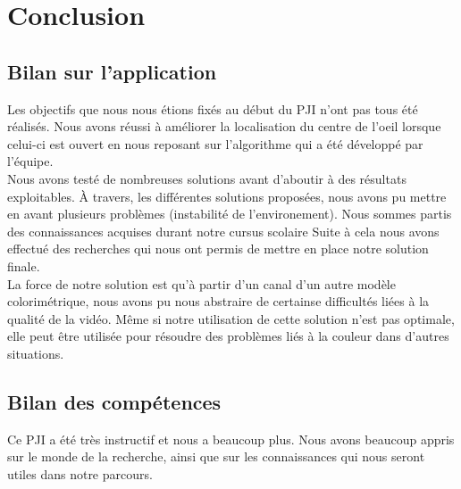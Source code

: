 \section{Conclusion}

\subsection{Bilan sur l'application}
Les objectifs que nous nous étions fixés au début du PJI n'ont pas tous été réalisés. Nous avons réussi à
améliorer la localisation du centre de l'oeil lorsque celui-ci est ouvert en nous reposant sur 
l'algorithme qui a été développé par l'équipe.\\

Nous avons testé de nombreuses solutions avant d'aboutir à des résultats exploitables. À travers, les différentes 
solutions proposées, nous avons pu mettre en avant plusieurs problèmes (instabilité de l'environement).
Nous sommes partis des connaissances acquises durant notre cursus scolaire 
Suite à cela nous avons effectué des recherches qui nous ont permis de mettre en place 
notre solution finale.\\


La force de notre solution est qu'à partir d'un canal d'un autre modèle colorimétrique, nous avons pu 
nous abstraire de certainse difficultés liées à la qualité de la vidéo. Même si notre utilisation de cette
solution n'est pas optimale, elle peut être utilisée pour résoudre des problèmes liés à la couleur dans d'autres situations.\\

\subsection{Bilan des compétences}
Ce PJI a été très instructif et nous a beaucoup plus. Nous avons beaucoup appris sur le monde 
de la recherche, ainsi que sur les connaissances qui nous seront utiles dans notre parcours.\\

